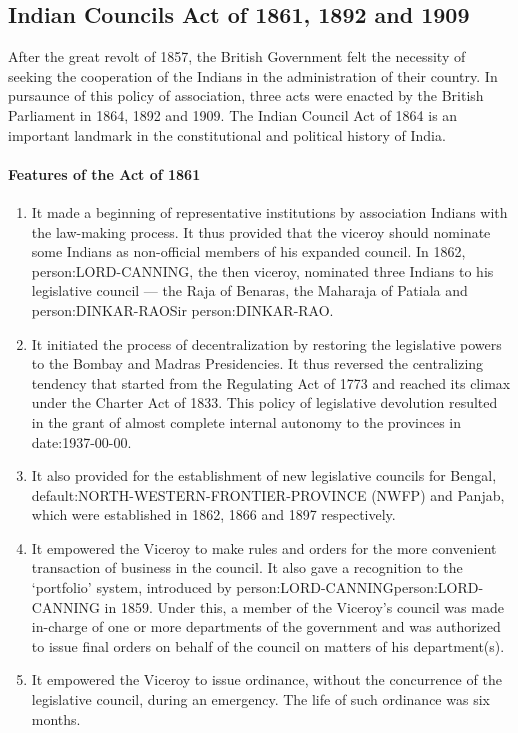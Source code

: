 \subsection{Indian Councils Act of 1861, 1892 and 1909}

After the great revolt of 1857, the British Government felt the necessity of seeking the cooperation of the Indians in the administration of their country. In pursaunce of this policy of association, three acts were enacted by the British Parliament in 1864, 1892 and 1909. The Indian Council Act of 1864 is an important landmark in the constitutional and political history of India.

\paragraph{Features of the Act of 1861}
\begin{enumerate}
  \item It made a beginning of representative institutions by association Indians with the law-making process. It thus provided that the viceroy should nominate some Indians as non-official members of his expanded council. In 1862, \gls{person:LORD-CANNING}, the then viceroy, nominated three Indians to his legislative council — the Raja of Benaras, the Maharaja of Patiala and \gls{person:DINKAR-RAO}Sir \gls{person:DINKAR-RAO}.
  \item It initiated the process of decentralization by restoring the legislative powers to the Bombay and Madras Presidencies. It thus reversed the centralizing tendency that started from the Regulating Act of 1773 and reached its climax under the Charter Act of 1833. This policy of legislative devolution resulted in the grant of almost complete internal autonomy to the provinces in \gls{date:1937-00-00}.
  \item It also provided for the establishment of new legislative councils for Bengal, \gls{default:NORTH-WESTERN-FRONTIER-PROVINCE} (NWFP) and Panjab, which were established in 1862, 1866 and 1897 respectively.
  \item It empowered the Viceroy to make rules and orders for the more convenient transaction of business in the council. It also gave a recognition to the  `portfolio' system, introduced by \gls{person:LORD-CANNING}\gls{person:LORD-CANNING} in 1859. Under this, a member of the Viceroy's council was made in-charge of one or more departments of the government and was authorized to issue final orders on behalf of the council on matters of his department(s).
  \item It empowered the Viceroy to issue ordinance, without the concurrence of the legislative council, during an emergency. The life of such ordinance was six months.
\end{enumerate}

